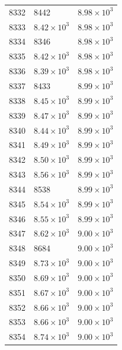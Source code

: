 \begin{table}[H]
\begin{tabular}{lll}
8332 & 8442 & $\displaystyle 8.98 \times 10^{3}$ \\
8333 & $\displaystyle 8.42 \times 10^{3}$ & $\displaystyle 8.98 \times 10^{3}$ \\
8334 & 8346 & $\displaystyle 8.98 \times 10^{3}$ \\
8335 & $\displaystyle 8.42 \times 10^{3}$ & $\displaystyle 8.98 \times 10^{3}$ \\
8336 & $\displaystyle 8.39 \times 10^{3}$ & $\displaystyle 8.98 \times 10^{3}$ \\
8337 & 8433 & $\displaystyle 8.99 \times 10^{3}$ \\
8338 & $\displaystyle 8.45 \times 10^{3}$ & $\displaystyle 8.99 \times 10^{3}$ \\
8339 & $\displaystyle 8.47 \times 10^{3}$ & $\displaystyle 8.99 \times 10^{3}$ \\
8340 & $\displaystyle 8.44 \times 10^{3}$ & $\displaystyle 8.99 \times 10^{3}$ \\
8341 & $\displaystyle 8.49 \times 10^{3}$ & $\displaystyle 8.99 \times 10^{3}$ \\
8342 & $\displaystyle 8.50 \times 10^{3}$ & $\displaystyle 8.99 \times 10^{3}$ \\
8343 & $\displaystyle 8.56 \times 10^{3}$ & $\displaystyle 8.99 \times 10^{3}$ \\
8344 & 8538 & $\displaystyle 8.99 \times 10^{3}$ \\
8345 & $\displaystyle 8.54 \times 10^{3}$ & $\displaystyle 8.99 \times 10^{3}$ \\
8346 & $\displaystyle 8.55 \times 10^{3}$ & $\displaystyle 8.99 \times 10^{3}$ \\
8347 & $\displaystyle 8.62 \times 10^{3}$ & $\displaystyle 9.00 \times 10^{3}$ \\
8348 & 8684 & $\displaystyle 9.00 \times 10^{3}$ \\
8349 & $\displaystyle 8.73 \times 10^{3}$ & $\displaystyle 9.00 \times 10^{3}$ \\
8350 & $\displaystyle 8.69 \times 10^{3}$ & $\displaystyle 9.00 \times 10^{3}$ \\
8351 & $\displaystyle 8.67 \times 10^{3}$ & $\displaystyle 9.00 \times 10^{3}$ \\
8352 & $\displaystyle 8.66 \times 10^{3}$ & $\displaystyle 9.00 \times 10^{3}$ \\
8353 & $\displaystyle 8.66 \times 10^{3}$ & $\displaystyle 9.00 \times 10^{3}$ \\
8354 & $\displaystyle 8.74 \times 10^{3}$ & $\displaystyle 9.00 \times 10^{3}$ \\

\end{tabular}
\end{table}
